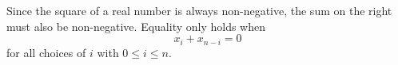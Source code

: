\documentclass{article}
\begin{document}
\begin{enumerate}[1.]
Since the square of a real number is always non-negative, the sum on the right must also be non-negative. Equality only holds when
$$x_i + x_{n - i} = 0$$
for all choices of $i$ with $0 \le i \le n$.

\end{enumerate}
\end{document}
